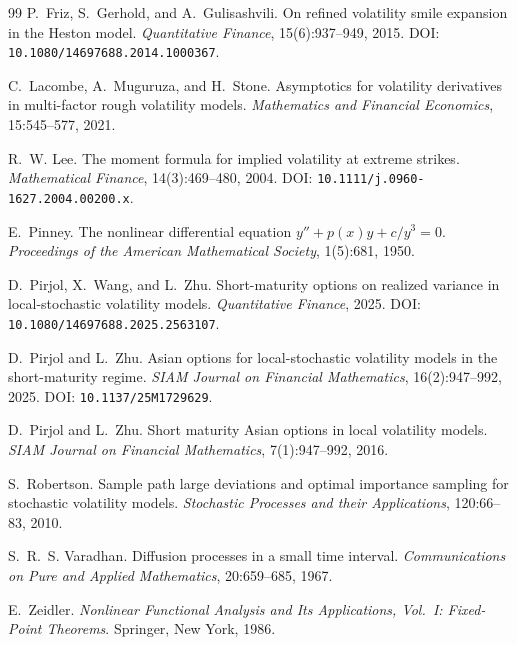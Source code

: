\documentclass[11pt]{article}
\theoremstyle{definition}
\begin{document}
\begin{thebibliography}{99}
P.~Friz, S.~Gerhold, and A.~Gulisashvili.
\newblock On refined volatility smile expansion in the {H}eston model.
\newblock \emph{Quantitative Finance}, 15(6):937--949, 2015.
\newblock DOI: \texttt{10.1080/14697688.2014.1000367}.

C.~Lacombe, A.~Muguruza, and H.~Stone.
\newblock Asymptotics for volatility derivatives in multi-factor rough volatility models.
\newblock \emph{Mathematics and Financial Economics}, 15:545--577, 2021.

R.~W. Lee.
\newblock The moment formula for implied volatility at extreme strikes.
\newblock \emph{Mathematical Finance}, 14(3):469--480, 2004.
\newblock DOI: \texttt{10.1111/j.0960-1627.2004.00200.x}.

E.~Pinney.
\newblock The nonlinear differential equation $y'' + p(x)y + c/y^3 = 0$.
\newblock \emph{Proceedings of the American Mathematical Society}, 1(5):681, 1950.

D.~Pirjol, X.~Wang, and L.~Zhu.
\newblock Short-maturity options on realized variance in local-stochastic volatility models.
\newblock \emph{Quantitative Finance}, 2025.
\newblock DOI: \texttt{10.1080/14697688.2025.2563107}.

D.~Pirjol and L.~Zhu.
\newblock Asian options for local-stochastic volatility models in the short-maturity regime.
\newblock \emph{SIAM Journal on Financial Mathematics}, 16(2):947--992, 2025.
\newblock DOI: \texttt{10.1137/25M1729629}.

D.~Pirjol and L.~Zhu.
\newblock Short maturity {A}sian options in local volatility models.
\newblock \emph{SIAM Journal on Financial Mathematics}, 7(1):947--992, 2016.

S.~Robertson.
\newblock Sample path large deviations and optimal importance sampling for stochastic volatility models.
\newblock \emph{Stochastic Processes and their Applications}, 120:66--83, 2010.

S.~R.~S. Varadhan.
\newblock Diffusion processes in a small time interval.
\newblock \emph{Communications on Pure and Applied Mathematics}, 20:659--685, 1967.

E.~Zeidler.
\newblock \emph{Nonlinear Functional Analysis and Its Applications, Vol.~I: Fixed-Point Theorems}.
\newblock Springer, New York, 1986.

\end{thebibliography}
\end{document}

